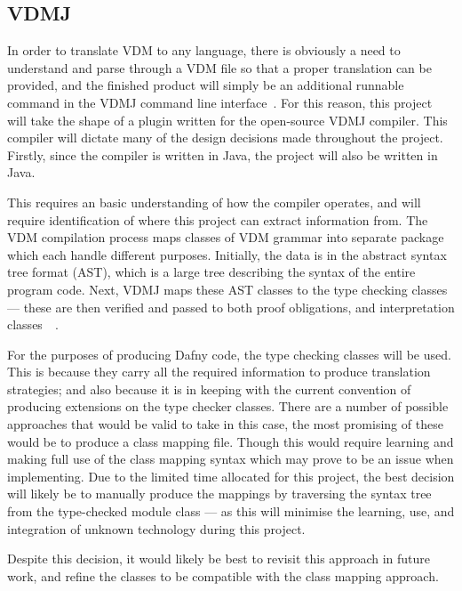 \documentclass{entcs}
\begin{document}
\subsection{VDMJ}\label{section:vdmj}

In order to translate VDM to any language, there is obviously a need to understand and parse through a VDM file so that a proper translation can be provided, and the finished product will simply be an additional runnable command in the VDMJ command line interface~\cite{VDMJPluginWriters}. For this reason, this project will take the shape of a plugin written for the open-source VDMJ compiler. This compiler will dictate many of the design decisions made throughout the project. Firstly, since the compiler is written in Java, the project will also be written in Java.

This requires an basic understanding of how the compiler operates, and will require identification of where this project can extract information from. The VDM compilation process maps classes of VDM grammar into separate package which each handle different purposes. Initially, the data is in the abstract syntax tree format (AST), which is a large tree describing the syntax of the entire program code. Next, VDMJ maps these AST classes to the type checking classes --- these are then verified and passed to both proof obligations, and interpretation classes~\cite{VDMJDesignSpec}~\cite{VDMJClassMapping}. 

For the purposes of producing Dafny code, the type checking classes will be used. This is because they carry all the required information to produce translation strategies; and also because it is in keeping with the current convention of producing extensions on the type checker classes. There are a number of possible approaches that would be valid to take in this case, the most promising of these would be to produce a class mapping file. Though this would require learning and making full use of the class mapping syntax which may prove to be an issue when implementing. Due to the limited time allocated for this project, the best decision will likely be to manually produce the mappings by traversing the syntax tree from the type-checked module class --- as this will minimise the learning, use, and integration of unknown technology during this project.

Despite this decision, it would likely be best to revisit this approach in future work, and refine the classes to be compatible with the class mapping approach. 
\end{document}
